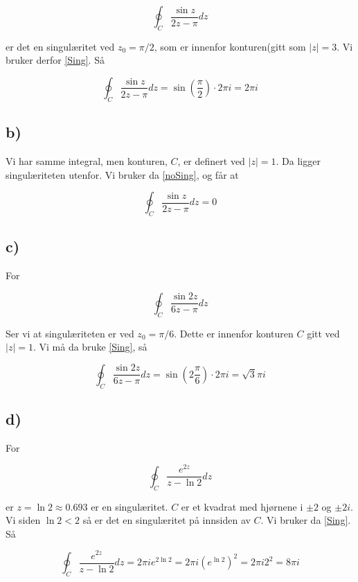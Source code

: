 \documentclass[a4paper,norsk, 10pt]{article}
\begin{document}
$$
\oint_C \frac{\sin z}{2z-\pi} dz
$$

er det en singulæritet ved $z_0 = \pi/2$, som er innenfor konturen(gitt som $|z| = 3$. Vi bruker derfor \ref{Sing}. Så

$$
\oint_C \frac{\sin z}{2z-\pi} dz = \sin(\frac{\pi}{2})\cdot2\pi i = 2\pi i
$$

\subsection*{b)}
Vi har samme integral, men konturen, $C$, er definert ved $|z| = 1$. Da ligger singulæriteten utenfor. Vi bruker da \ref{noSing}, og får at

$$
\oint_C \frac{\sin z}{2z-\pi} dz = 0
$$

\subsection*{c)}

For

$$
\oint_C \frac{\sin 2z}{6z-\pi} dz
$$

Ser vi at singulæriteten er ved $z_0 = \pi/6$. Dette er innenfor konturen $C$ gitt ved $|z| = 1$. Vi må da bruke \ref{Sing}, så

$$
\oint_C \frac{\sin 2z}{6z-\pi} dz = \sin(2\frac{\pi}{6})\cdot2\pi i = \sqrt{3}\pi i
$$

\subsection*{d)}

For 

$$
\oint_C \frac{e^{2z}}{z-\ln 2} dz
$$

er $z = \ln 2 \approx 0.693$ er en singulæritet. $C$ er et kvadrat med hjørnene i $\pm 2$ og $\pm 2i$. Vi siden $\ln 2 < 2$ så er det en singulæritet på innsiden av $C$. Vi bruker da \ref{Sing}. Så

$$
\oint_C \frac{e^{2z}}{z-\ln 2} dz = 2\pi i e^{2\ln2} =2\pi i (e^{\ln2})^2 = 2\pi i 2^2 = 8\pi i
$$



 

\end{document}

